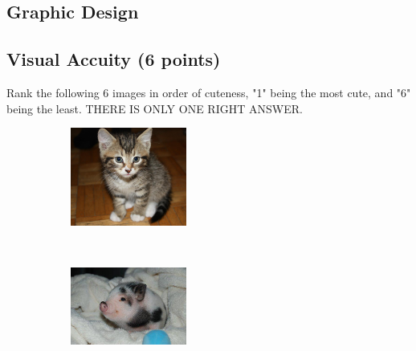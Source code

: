 \documentclass[11pt]{exam}
\begin{document}
\begin{questions}
\newpage
\section{Graphic Design}
\subsection{Visual Accuity (6 points)}
\setcounter{question}{0}

\question Rank the following 6 images in order of cuteness, "1" being the most cute, and "6" being the least. THERE IS ONLY ONE RIGHT ANSWER. 

\begin{figure}[h]
    \centering
    \begin{subfigure}[b]{0.3\textwidth}
        \includegraphics[width=\textwidth]{cute1}
        \caption{\underline{\hspace{2cm}}} 
        \label{fig:anzu}
    \end{subfigure}
    ~ %
    \begin{subfigure}[b]{0.3\textwidth}
        \includegraphics[width=\textwidth]{cute2}

\end{subfigure}
\end{figure}
\end{questions}
\end{document}
